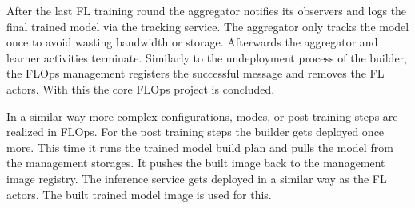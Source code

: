 After the last FL training round the aggregator notifies its observers and logs the final trained model via the tracking service.
The aggregator only tracks the model once to avoid wasting bandwidth or storage.
Afterwards the aggregator and learner activities terminate.
Similarly to the undeployment process of the builder, the FLOps management registers the successful message and removes the FL actors.
With this the core FLOps project is concluded.

In a similar way more complex configurations, modes, or post training steps are realized in FLOps.
For the post training steps the builder gets deployed once more.
This time it runs the trained model build plan and pulls the model from the management storages.
It pushes the built image back to the management image registry.
The inference service gets deployed in a similar way as the FL actors.
The built trained model image is used for this.






